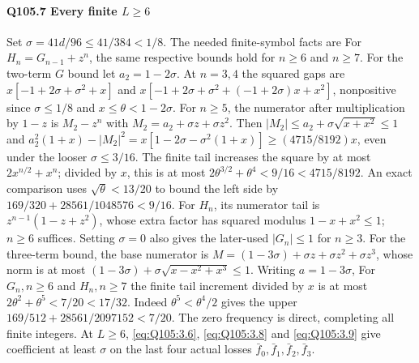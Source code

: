\paragraph{Q105.7 Every finite $L\ge\allowbreak 6$}\label{part:Q105.7}
Set $\sigma=\allowbreak 41d/96\le\allowbreak 41/384<\allowbreak 1/8$.
The needed finite-symbol facts are
For $H_n=\allowbreak G_{n-1}+z^n$, the same respective bounds hold for $n\ge\allowbreak 6$
and $n\ge\allowbreak 7$.
For the two-term $G$ bound let $a_2=\allowbreak 1-2\sigma$.
At $n=\allowbreak 3,\allowbreak 4$ the squared gaps are
$x[-1+2\sigma+\sigma^2+x]$ and
$x[-1+2\sigma+\sigma^2+(-1+2\sigma)x+x^2]$, nonpositive since
$\sigma\le\allowbreak 1/8$ and $x\le\allowbreak \theta<\allowbreak 1-2\sigma$.
For $n\ge\allowbreak 5$, the numerator after multiplication by $1-z$ is
$M_2-z^n$ with $M_2=\allowbreak a_2+\sigma z+\sigma z^2$.
Then $|M_2|\le\allowbreak  a_2+\sigma\sqrt{x+x^2}\le\allowbreak 1$ and
$a_2^2(1+x)-|M_2|^2=\allowbreak x[1-2\sigma-\sigma^2(1+x)]\ge\allowbreak (4715/8192)x$,
even under the looser $\sigma\le\allowbreak 3/16$.
The finite tail increases the square by at most $2x^{n/2}+x^n$;
divided by $x$, this is at most
$2\theta^{3/2}+\theta^4<\allowbreak 9/16<\allowbreak 4715/8192$.
An exact comparison uses $\sqrt\theta<\allowbreak 13/20$ to bound the left side
by $169/320+28561/1048576<\allowbreak 9/16$.
For $H_n$, its numerator tail is $z^{n-1}(1-z+z^2)$, whose extra
factor has squared modulus $1-x+x^2\le\allowbreak 1$; $n\ge\allowbreak 6$ suffices.
Setting $\sigma=\allowbreak 0$ also gives the later-used $|G_n|\le\allowbreak 1$ for $n\ge\allowbreak 3$.
For the three-term bound, the base numerator is
$M=\allowbreak (1-3\sigma)+\sigma z+\sigma z^2+\sigma z^3$,
whose norm is at most $(1-3\sigma)+\sigma\sqrt{x-x^2+x^3}\le\allowbreak 1$.
Writing $a=\allowbreak 1-3\sigma$,
For $G_n,\allowbreak n\ge\allowbreak 6$ and $H_n,\allowbreak n\ge\allowbreak 7$ the finite tail increment divided
by $x$ is at most $2\theta^2+\theta^5<\allowbreak 7/20<\allowbreak 17/32$.
Indeed $\theta^5<\allowbreak \theta^4/2$ gives the upper
$169/512+28561/2097152<\allowbreak 7/20$.
The zero frequency is direct, completing all finite integers.
At $L\ge\allowbreak 6$, \eqref{eq:Q105:3.6}, \eqref{eq:Q105:3.8} and
\eqref{eq:Q105:3.9} give coefficient at least $\sigma$ on the last
four actual losses $\bar f_0,\allowbreak \bar f_1,\allowbreak \bar f_2,\allowbreak \bar f_3$.
